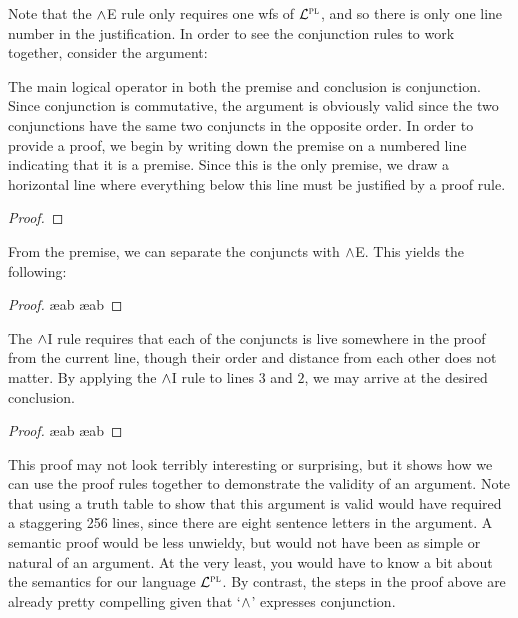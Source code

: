 Note that the $\wedge$E rule only requires one wfs of $\mathcal{L}^{\textsc{pl}}$, and so there is only one line number in the justification.
In order to see the conjunction rules to work together, consider the argument:
\begin{earg}
\end{earg}
The main logical operator in both the premise and conclusion is conjunction.
Since conjunction is commutative, the argument is obviously valid since the two conjunctions have the same two conjuncts in the opposite order.
In order to provide a proof, we begin by writing down the premise on a numbered line indicating that it is a premise.
Since this is the only premise, we draw a horizontal line where everything below this line must be justified by a proof rule.
\begin{proof}
	 \pr{}
\end{proof}
From the premise, we can separate the conjuncts with $\wedge$E.
This yields the following:
\begin{proof}
	 \pr{}
	 \ae{ab}
	 \ae{ab}
\end{proof}
The $\wedge$I rule requires that each of the conjuncts is live somewhere in the proof from the current line, though their order and distance from each other does not matter.
By applying the $\wedge$I rule to lines $3$ and $2$, we may arrive at the desired conclusion.

\begin{proof}
	 \pr{}

	 \ae{ab}
	 \ae{ab}
	 
\end{proof}

This proof may not look terribly interesting or surprising, but it shows how we can use the proof rules together to demonstrate the validity of an argument.
Note that using a truth table to show that this argument is valid would have required a staggering 256 lines, since there are eight sentence letters in the argument.
A semantic proof would be less unwieldy, but would not have been as simple or natural of an argument.
At the very least, you would have to know a bit about the semantics for our language $\mathcal{L}^{\textsc{pl}}$.
By contrast, the steps in the proof above are already pretty compelling given that `$\wedge$' expresses conjunction.





